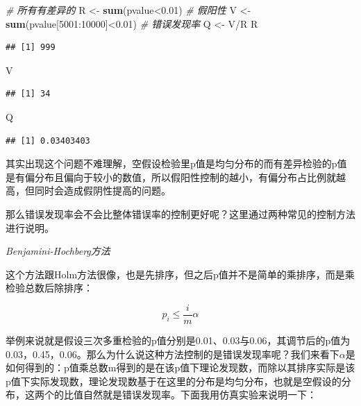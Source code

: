 \documentclass[]{tufte-book}
\newenvironment{Shaded}{}{}
\newcommand{\CommentTok}[1]{\textcolor[rgb]{0.38,0.63,0.69}{\textit{#1}}}
\newcommand{\DecValTok}[1]{\textcolor[rgb]{0.25,0.63,0.44}{#1}}
\newcommand{\FloatTok}[1]{\textcolor[rgb]{0.25,0.63,0.44}{#1}}
\newcommand{\KeywordTok}[1]{\textcolor[rgb]{0.00,0.44,0.13}{\textbf{#1}}}
\newcommand{\NormalTok}[1]{#1}
\newcommand{\OperatorTok}[1]{\textcolor[rgb]{0.40,0.40,0.40}{#1}}
\newcommand{\StringTok}[1]{\textcolor[rgb]{0.25,0.44,0.63}{#1}}
\begin{document}
\begin{Shaded}
\begin{Highlighting}[]
\CommentTok{# 所有有差异的}
\NormalTok{R <-}\StringTok{ }\KeywordTok{sum}\NormalTok{(pvalue}\OperatorTok{<}\FloatTok{0.01}\NormalTok{)}
\CommentTok{# 假阳性}
\NormalTok{V <-}\StringTok{ }\KeywordTok{sum}\NormalTok{(pvalue[}\DecValTok{5001}\OperatorTok{:}\DecValTok{10000}\NormalTok{]}\OperatorTok{<}\FloatTok{0.01}\NormalTok{)}
\CommentTok{# 错误发现率}
\NormalTok{Q <-}\StringTok{ }\NormalTok{V}\OperatorTok{/}\NormalTok{R}
\NormalTok{R}
\end{Highlighting}
\end{Shaded}

\begin{verbatim}
## [1] 999
\end{verbatim}

\begin{Shaded}
\begin{Highlighting}[]
\NormalTok{V}
\end{Highlighting}
\end{Shaded}

\begin{verbatim}
## [1] 34
\end{verbatim}

\begin{Shaded}
\begin{Highlighting}[]
\NormalTok{Q}
\end{Highlighting}
\end{Shaded}

\begin{verbatim}
## [1] 0.03403403
\end{verbatim}

其实出现这个问题不难理解，空假设检验里p值是均匀分布的而有差异检验的p值是有偏分布且偏向于较小的数值，所以假阳性控制的越小，有偏分布占比例就越高，但同时会造成假阴性提高的问题。

那么错误发现率会不会比整体错误率的控制更好呢？这里通过两种常见的控制方法进行说明。

\emph{Benjamini-Hochberg方法}

这个方法跟Holm方法很像，也是先排序，但之后p值并不是简单的乘排序，而是乘检验总数后除排序：

\[
p_i \leq \frac{i}{m} \alpha
\]

举例来说就是假设三次多重检验的p值分别是0.01、0.03与0.06，其调节后的p值为0.03，0.45，0.06。那么为什么说这种方法控制的是错误发现率呢？我们来看下\(\alpha\)是如何得到的：p值乘总数m得到的是在该p值下理论发现数，而除以其排序实际是该p值下实际发现数，理论发现数基于在这里的分布是均匀分布，也就是空假设的分布，这两个的比值自然就是错误发现率。下面我用仿真实验来说明一下：
\end{document}
